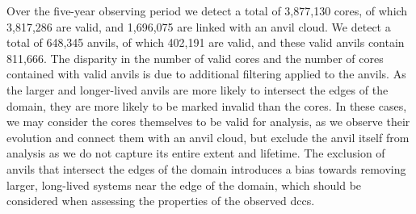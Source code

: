 Over the five-year observing period we detect a total of 3,877,130 cores, of which 3,817,286 are valid, and 1,696,075 are linked with an anvil cloud. 
We detect a total of 648,345 anvils, of which 402,191 are valid, and these valid anvils contain 811,666.
The disparity in the number of valid cores and the number of cores contained with valid anvils is due to additional filtering applied to the anvils.
As the larger and longer-lived anvils are more likely to intersect the edges of the domain, they are more likely to be marked invalid than the cores.
In these cases, we may consider the cores themselves to be valid for analysis, as we observe their evolution and connect them with an anvil cloud, but exclude the anvil itself from analysis as we do not capture its entire extent and lifetime.
The exclusion of anvils that intersect the edges of the domain introduces a bias towards removing larger, long-lived systems near the edge of the domain, which should be considered when assessing the properties of the observed \acrshort{dcc}s.






